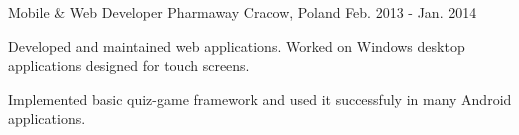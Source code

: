 \begin{cventries}
  \cventry
    {Mobile \& Web Developer} %
    {Pharmaway} %
    {Cracow, Poland} %
    {Feb. 2013 - Jan. 2014} %
    {
      \begin{cvitems} %
        \item {Developed and maintained web applications. Worked on Windows desktop applications designed for touch screens.}
        \item {Implemented basic quiz-game framework and used it successfuly in many Android applications.}
      \end{cvitems}
    }

\end{cventries}
